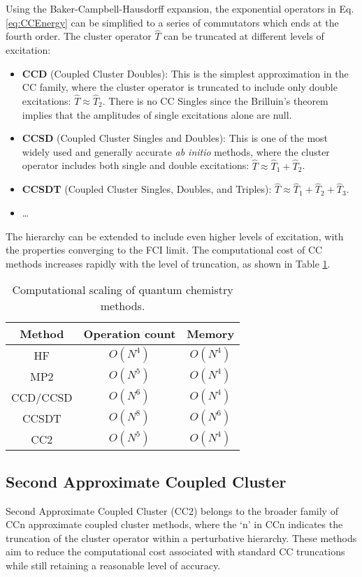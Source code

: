 Using the Baker-Campbell-Hausdorff expansion, the exponential operators in Eq. \ref{eq:CCEnergy} can be simplified to a series of commutators which ends at the fourth order. The cluster operator $\hat{T}$ can be truncated at different levels of excitation:
\begin{itemize}
    \item \textbf{CCD} (Coupled Cluster Doubles): This is the simplest approximation in the CC family, where the cluster operator is truncated to include only double excitations: $\hat{T} \approx \hat{T}_2$. There is no CC Singles since the Brilluin's theorem implies that the amplitudes of single excitations alone are null. 
    \item \textbf{CCSD} (Coupled Cluster Singles and Doubles): This is one of the most widely used and generally accurate \textit{ab initio} methods, where the cluster operator includes both single and double excitations: $\hat{T} \approx \hat{T}_1 + \hat{T}_2$.
    \item \textbf{CCSDT} (Coupled Cluster Singles, Doubles, and Triples): $\hat{T} \approx \hat{T}_1 + \hat{T}_2 + \hat{T}_3$.
    \item \ldots
\end{itemize}
The hierarchy can be extended to include even higher levels of excitation,  with the properties converging to the FCI limit. The computational cost of CC methods increases rapidly with the level of truncation, as shown in Table \ref{tab:qc_scaling}.
\begin{table}[h!]
    \centering
    \begin{tabular}{ccc}
        Method & Operation count & Memory \\
        \hline
        HF & $O(N^4)$ & $O(N^4)$ \\
        MP2 & $O(N^5)$ & $O(N^4)$ \\
        CCD/CCSD & $O(N^6)$ & $O(N^4)$ \\
        CCSDT & $O(N^8)$ & $O(N^6)$ \\
        CC2 & $O(N^{5})$ & $O(N^4)$ \\
    \end{tabular}
    \caption{Computational scaling of quantum chemistry methods.}
    \label{tab:qc_scaling}
\end{table}

\subsection{Second Approximate Coupled Cluster}\label{sec:CC2Theory}
Second Approximate Coupled Cluster (CC2) belongs to the broader family of CCn approximate coupled cluster methods, where the `n' in CCn indicates the truncation of the cluster operator within a perturbative hierarchy. These methods aim to reduce the computational cost associated with standard CC truncations while still retaining a reasonable level of accuracy.\\

